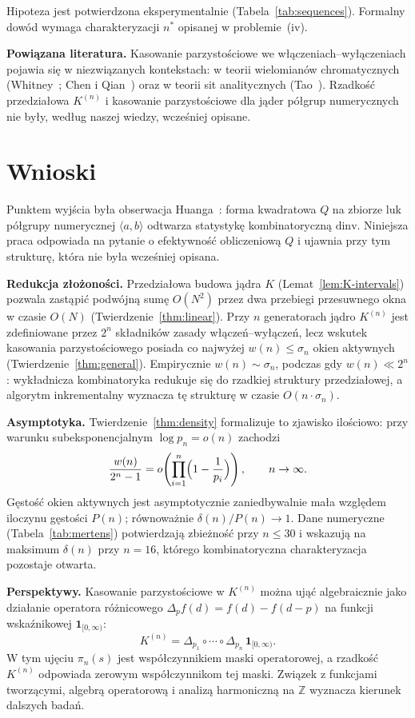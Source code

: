 \documentclass[11pt,a4paper]{amsart}
\theoremstyle{plain}
\theoremstyle{definition}
\theoremstyle{remark}
\begin{document}
Hipoteza jest potwierdzona eksperymentalnie
(Tabela~\ref{tab:sequences}).
Formalny dowód wymaga charakteryzacji $n^*$
opisanej w problemie~(iv).

\medskip
\textbf{Powiązana literatura.}
Kasowanie parzystościowe we włączeniach--wyłączeniach
pojawia się w niezwiązanych kontekstach:
w teorii wielomianów chromatycznych
(Whitney~\cite{Whitney1932}; Chen i Qian~\cite{ChenQian2018})
oraz w teorii sit analitycznych
(Tao~\cite{Tao2007}).
Rzadkość przedziałowa $K^{(n)}$ i kasowanie
parzystościowe dla jąder półgrup numerycznych
nie były, według naszej wiedzy, wcześniej opisane.

\section{Wnioski}
\label{sec:conclusion}

Punktem wyjścia była obserwacja Huanga~\cite{Huang2026}:
forma kwadratowa $Q$ na zbiorze luk półgrupy numerycznej
$\langle a, b \rangle$ odtwarza statystykę kombinatoryczną $\mathrm{dinv}$.
Niniejsza praca odpowiada na pytanie o efektywność obliczeniową $Q$
i ujawnia przy tym strukturę, która nie była wcześniej opisana.

\textbf{Redukcja złożoności.}
Przedziałowa budowa jądra $K$ (Lemat~\ref{lem:K-intervals})
pozwala zastąpić podwójną sumę $O(N^2)$ przez dwa przebiegi
przesuwnego okna w czasie $O(N)$ (Twierdzenie~\ref{thm:linear}).
Przy $n$ generatorach jądro $K^{(n)}$ jest zdefiniowane przez
$2^n$ składników zasady włączeń--wyłączeń, lecz wskutek kasowania parzystościowego posiada co najwyżej
$w(n) \leq \sigma_n$ okien aktywnych (Twierdzenie~\ref{thm:general}).
Empirycznie $w(n) \sim \sigma_n$, podczas gdy $w(n) \ll 2^n$:
wykładnicza kombinatoryka redukuje się do rzadkiej struktury
przedziałowej, a algorytm inkrementalny wyznacza tę strukturę
w czasie $O(n \cdot \sigma_n)$.

\textbf{Asymptotyka.}
Twierdzenie~\ref{thm:density} formalizuje to zjawisko ilościowo:
przy warunku subeksponencjalnym $\log p_n = o(n)$ zachodzi
\[
  \frac{w(n)}{2^n - 1} = o\!\left(\prod_{i=1}^n
    \Bigl(1 - \frac{1}{p_i}\Bigr)\right), \qquad n \to \infty.
\]
Gęstość okien aktywnych jest asymptotycznie zaniedbywalnie mała
względem iloczynu gęstości $P(n)$; równoważnie $\delta(n)/P(n) \to 1$.
Dane numeryczne (Tabela~\ref{tab:mertens}) potwierdzają zbieżność
przy $n \leq 30$ i wskazują na maksimum $\delta(n)$ przy $n = 16$,
którego kombinatoryczna charakteryzacja pozostaje otwarta.

\textbf{Perspektywy.}
Kasowanie parzystościowe w $K^{(n)}$ można ująć algebraicznie jako
działanie operatora różnicowego
$\Delta_{p} f(d) = f(d) - f(d - p)$
na funkcji wskaźnikowej $\mathbf{1}_{[0,\infty)}$:
\[
  K^{(n)} = \Delta_{p_1} \circ \cdots \circ \Delta_{p_n}\,
             \mathbf{1}_{[0,\infty)}.
\]
W tym ujęciu $\pi_n(s)$ jest współczynnikiem maski operatorowej,
a rzadkość $K^{(n)}$ odpowiada zerowym współczynnikom tej maski.
Związek z funkcjami tworzącymi, algebrą operatorową
i analizą harmoniczną na $\mathbb{Z}$ wyznacza kierunek
dalszych badań.


\clearpage
\printbibliography
\end{document}
